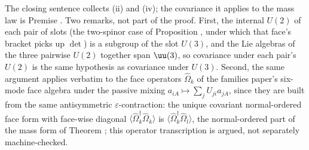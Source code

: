 The closing sentence collects (ii) and (iv); the covariance it applies to the mass law is Premise . Two remarks, not part of the proof. First, the internal $U(2)$ of each pair of slots (the two-spinor case of Proposition , under which that face's bracket picks up $\det$) is a subgroup of the slot $U(3)$, and the Lie algebras of the three pairwise $U(2)$ together span $\uu(3)$, so covariance under each pair's $U(2)$ is the same hypothesis as covariance under $U(3)$. Second, the same argument applies verbatim to the face operators $\hat\Omega_{k}$ of the families paper's six-mode face algebra under the passive mixing $a_{iA} \mapsto \sum_{j}U_{ji}a_{jA}$, since they are built from the same antisymmetric $\varepsilon$-contraction: the unique covariant normal-ordered face form with face-wise diagonal $\langle\hat\Omega_{k}^{\dagger}\hat\Omega_{k}\rangle$ is $\langle\hat\Omega_{k}^{\dagger}\hat\Omega_{l}\rangle$, the normal-ordered part of the mass form of Theorem ; this operator transcription is argued, not separately machine-checked.

